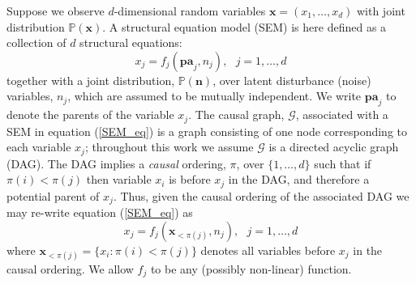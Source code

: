 \documentclass{article}
\begin{document}
Suppose we observe $d$-dimensional random variables $\textbf{x}= (x_1, \ldots, x_d)$ 
with joint distribution $\mathbb{P}(\textbf{x})$.  %
%
A structural equation model (SEM) is here defined 
as a 
collection of $d$ 
structural equations:
\begin{equation}
\label{SEM_eq}
x_j = f_j ( \textbf{pa}_j, n_j), ~~ ~ j=1, \ldots ,d
\end{equation}
together with a joint distribution, $\mathbb{P}(\textbf{n})$, %
over latent disturbance (noise)
variables, $n_j$,  which are assumed to be mutually  independent. 
We write $\textbf{pa}_j$ to denote the parents of the variable $x_j$. 
The causal graph, $\mathcal{G}$, associated with 
a SEM in equation (\ref{SEM_eq})
is a graph
consisting of one node corresponding to each variable $x_j$;
throughout this work we assume $\mathcal{G}$ 
is a directed acyclic graph (DAG). The DAG implies a \textit{causal}
ordering,
$\pi$, over $\{1, \ldots, d\}$ such that 
if $\pi(i) < \pi(j)$ then variable $x_i$ is before $x_j$ in the DAG, and therefore a potential parent of 
$x_j$. 
%
%
Thus, given the causal ordering of the associated DAG
%
we may re-write 
equation (\ref{SEM_eq}) as 
\begin{equation}
\label{SEM_eq_causalOrder}
x_j = f_j \left (  \textbf{x}_{ < \pi(j)}  ,  n_j \right ), ~~ ~ j=1, \ldots ,d
\end{equation}
where $\mathbf{x}_{< \pi(j)} = \{x_i: \pi(i) < \pi(j)\}$ denotes all variables before $x_j$ in the causal ordering.  
We allow 
$f_j$ %
to be any
(possibly non-linear) function.
\end{document}
